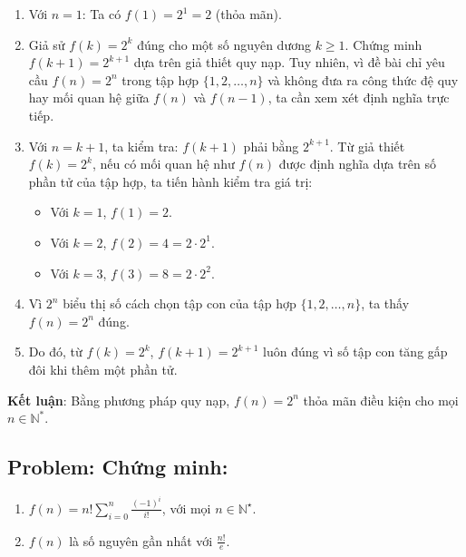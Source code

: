 \documentclass[a4paper,12pt]{article}
\begin{document}
\begin{enumerate}
    \item Với \( n = 1 \): Ta có \( f(1) = 2^1 = 2 \) (thỏa mãn).

    \item Giả sử \( f(k) = 2^k \) đúng cho một số nguyên dương \( k \geq 1 \).
Chứng minh \( f(k+1) = 2^{k+1} \) dựa trên giả thiết quy nạp. Tuy nhiên, vì đề bài chỉ yêu cầu \( f(n) = 2^n \) trong tập hợp \( \{1, 2, \ldots, n\} \) và không đưa ra công thức đệ quy hay mối quan hệ giữa \( f(n) \) và \( f(n-1) \), ta cần xem xét định nghĩa trực tiếp. 
    \item Với \( n = k+1 \), ta kiểm tra: \( f(k+1) \) phải bằng \( 2^{k+1} \). Từ giả thiết \( f(k) = 2^k \), nếu có mối quan hệ như \( f(n) \) được định nghĩa dựa trên số phần tử của tập hợp, ta tiến hành kiểm tra giá trị:
  \begin{itemize}
      \item Với \( k = 1 \), \( f(1) = 2 \).
      \item Với \( k = 2 \), \( f(2) = 4 = 2 \cdot 2^1 \).
      \item Với \( k = 3 \), \( f(3) = 8 = 2 \cdot 2^2 \).
    \end{itemize}
\item Vì \( 2^n \) biểu thị số cách chọn tập con của tập hợp \( \{1, 2, \ldots, n\} \), ta thấy \( f(n) = 2^n \) đúng. 
\item Do đó, từ \( f(k) = 2^k \), \( f(k+1) = 2^{k+1} \) luôn đúng vì số tập con tăng gấp đôi khi thêm một phần tử.
\end{enumerate}

\textbf{Kết luận}:
Bằng phương pháp quy nạp, \( f(n) = 2^n \) thỏa mãn điều kiện cho mọi \( n \in \mathbb{N}^* \).

\subsection*{Problem: Chứng minh:}
\begin{enumerate}[label=(\alph*)]
		\item \( f(n) = n! \sum_{i=0}^{n} \frac{(-1)^i}{i!} \), với mọi $n \in \mathbb{N}^\star$.
		\item \( f(n) \) là số nguyên gần nhất với \( \frac{n!}{e} \).
\end{enumerate}
\end{document}
